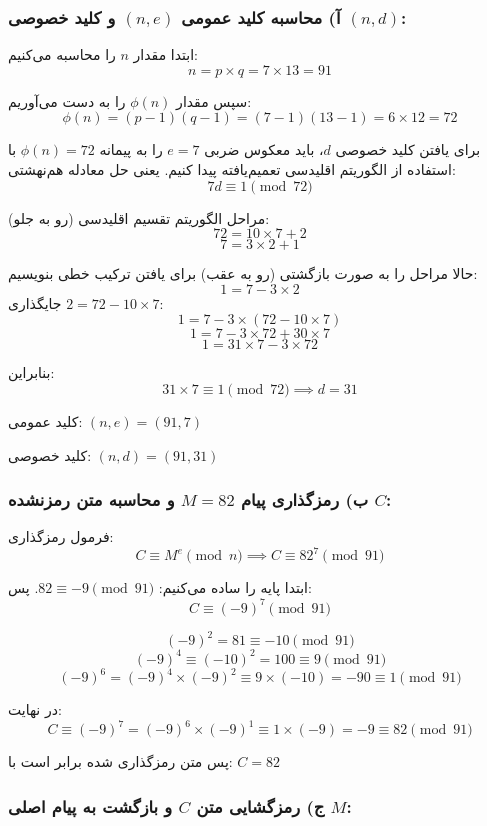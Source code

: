 
\subsubsection*{آ) محاسبه کلید عمومی $(n, e)$ و کلید خصوصی $(n, d)$:}

ابتدا مقدار $n$ را محاسبه می‌کنیم:
$$n = p \times q = 7 \times 13 = 91$$

سپس مقدار $\phi(n)$ را به دست می‌آوریم:
$$\phi(n) = (p-1)(q-1) = (7-1)(13-1) = 6 \times 12 = 72$$

برای یافتن کلید خصوصی $d$، باید معکوس ضربی $e=7$ را به پیمانه $\phi(n)=72$ با استفاده از {الگوریتم اقلیدسی تعمیم‌یافته} پیدا کنیم. یعنی حل معادله هم‌نهشتی:
$$ 7d \equiv 1 \pmod{72}$$

مراحل الگوریتم تقسیم اقلیدسی (رو به جلو):
$$72 = 10 \times 7 + 2$$
$$7 = 3 \times 2 + 1$$

حالا مراحل را به صورت بازگشتی (رو به عقب) برای یافتن ترکیب خطی بنویسیم:
$$1 = 7 - 3 \times 2$$
جایگذاری $2 = 72 - 10 \times 7$:
$$1 = 7 - 3 \times (72 - 10 \times 7)$$
$$1 = 7 - 3 \times 72 + 30 \times 7$$
$$1 = 31 \times 7 - 3 \times 72$$

بنابراین:
$$31 \times 7 \equiv 1 \pmod{72} \implies d = 31$$

{کلید عمومی:} $(n, e) = (91, 7)$

{کلید خصوصی:} $(n, d) = (91, 31)$


\subsubsection*{ب) رمزگذاری پیام $M = 82$ و محاسبه متن رمزنشده $C$:}

فرمول رمزگذاری:
$$C \equiv M^e \pmod{n} \implies C \equiv 82^7 \pmod{91}$$

ابتدا پایه را ساده می‌کنیم: $82 \equiv -9 \pmod{91}$. پس:
$$C \equiv (-9)^7 \pmod{91}$$

$$(-9)^2 = 81 \equiv -10 \pmod{91}$$
$$(-9)^4 \equiv (-10)^2 = 100 \equiv 9 \pmod{91}$$
$$(-9)^6 = (-9)^4 \times (-9)^2 \equiv 9 \times (-10) = -90 \equiv 1 \pmod{91}$$

در نهایت:
$$C \equiv (-9)^7 = (-9)^6 \times (-9)^1 \equiv 1 \times (-9) = -9 \equiv 82 \pmod{91}$$

پس متن رمزگذاری شده برابر است با: \textbf{$C = 82$}

\subsubsection*{ج) رمزگشایی متن $C$ و بازگشت به پیام اصلی $M$:}

